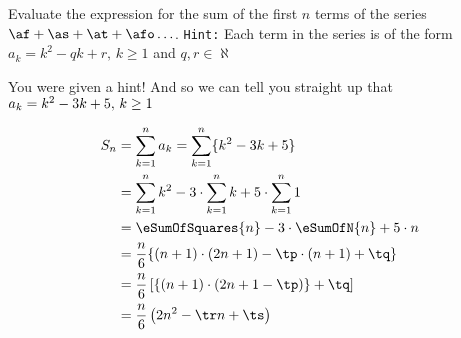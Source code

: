 \question[4] Evaluate the expression for the sum of the first $n$ terms of the 
series $\af + \as + \at + \afo \ldots$. \texttt{Hint:} Each term in the series is 
of the form $a_k = k^2 - qk + r, \, k \geq 1$ and $q,r \in\aleph$

\watchout
{}

\ifprintanswers
\fi 

\begin{solution}[\halfpage]
  You were given a hint! And so we can tell you straight up that $a_k = k^2 - 3 k + 5,\, k \geq 1$
	
	\begin{align}
		S_n &= \sum_{k=1}^{n}a_k = \sum_{k=1}^{n}\lbrace k^2 - \vbone k + \vbtwo \rbrace \\
		&= \sum_{k=1}^{n}k^2 - \vbone\cdot\sum_{k=1}^{n}k + \vbtwo\cdot\sum_{k=1}^{n}1 \\
		&= \eSumOfSquares{n} - \vbone\cdot\eSumOfN{n} + \vbtwo\cdot n \\
    &= \dfrac{n}{6}\lbrace (n+1)\cdot(2n+1) - \tp\cdot(n+1) + \tq \rbrace \\
    &= \dfrac{n}{6}\left[ \lbrace (n+1)\cdot(2n + 1 - \tp)\rbrace + \tq \right] \\
    &= \dfrac{n}{6}\left( 2n^2 - \tr n + \ts \right)
	\end{align}
\end{solution}
